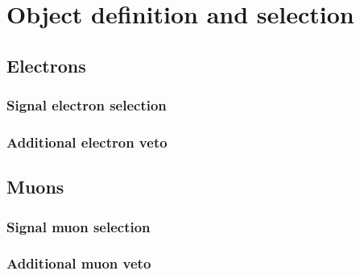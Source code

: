 \section{Object definition and selection}
\subsection{Electrons}
\subsubsection{Signal electron selection}
\subsubsection{Additional electron veto}
\subsection{Muons}
\subsubsection{Signal muon selection}
\label{sec:muon-selection}
\subsubsection{Additional muon veto}